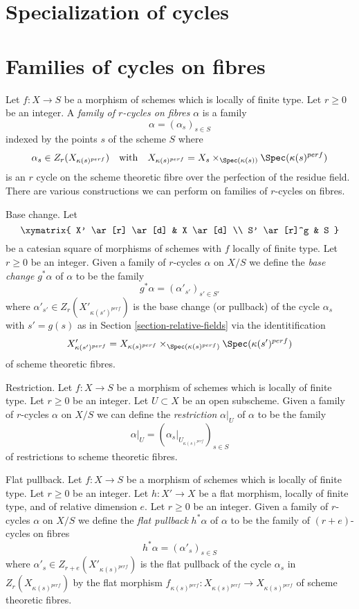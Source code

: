 \section{Specialization of cycles}
\label{section-specialization}


\section{Families of cycles on fibres}
\label{section-cycles-fibres}

\noindent
Let $f : X \to S$ be a morphism of schemes which is locally of finite type.
Let $r \geq 0$ be an integer. A {\it family of $r$-cycles on fibres}
$\alpha$ is a family
$$
\alpha = (\alpha_s)_{s \in S}
$$
indexed by the points $s$ of the scheme $S$ where
$$
\alpha_s \in Z_r(X_{\kappa(s)^{perf}})
\quad\text{with}\quad
X_{\kappa(s)^{perf}} = X_s \times_{\Spec(\kappa(s))} \Spec(\kappa(s)^{perf})
$$
is an $r$ cycle on the scheme theoretic fibre over the perfection of
the residue field. There are various constructions we can perform on
families of $r$-cycles on fibres.

\medskip\noindent
Base change. Let
$$
\xymatrix{
X' \ar[r] \ar[d] & X \ar[d] \\
S' \ar[r]^g & S
}
$$
be a catesian square of morphisms of schemes with $f$ locally of finite type.
Let $r \geq 0$ be an integer. Given a family of $r$-cycles $\alpha$
on $X/S$ we define the {\it base change} $g^*\alpha$ of $\alpha$
to be the family
$$
g^*\alpha = (\alpha'_{s'})_{s' \in S'}
$$
where $\alpha'_{s'} \in Z_r(X'_{\kappa(s')^{perf}})$ is the base change
(or pullback) of the cycle $\alpha_s$ with $s' = g(s)$ as in
Section \ref{section-relative-fields} via the identitification
$$
X'_{\kappa(s')^{perf}} =
X_{\kappa(s)^{perf}} \times_{\Spec(\kappa(s)^{perf})} \Spec(\kappa(s')^{perf})
$$
of scheme theoretic fibres.

\medskip\noindent
Restriction. Let $f : X \to S$ be a morphism of schemes which is locally
of finite type. Let $r \geq 0$ be an integer. Let $U \subset X$ be an open
subscheme. Given a family of $r$-cycles $\alpha$ on $X/S$ we can define
the {\it restriction} $\alpha|_U$ of $\alpha$ to be the family
$$
\alpha|_U = (\alpha_s|_{U_{\kappa(s)^{perf}}})_{s \in S}
$$
of restrictions to scheme theoretic fibres.

\medskip\noindent
Flat pullback. Let $f : X \to S$ be a morphism of schemes which is locally
of finite type. Let $r \geq 0$ be an integer. Let $h : X' \to X$ be a
flat morphism, locally of finite type, and of relative dimension $e$.
Let $r \geq 0$ be an integer. Given a family of $r$-cycles $\alpha$
on $X/S$ we define the {\it flat pullback} $h^*\alpha$ of $\alpha$
to be the family of $(r + e)$-cycles on fibres
$$
h^*\alpha = (\alpha'_s)_{s \in S}
$$
where $\alpha'_s \in Z_{r + e}(X'_{\kappa(s)^{perf}})$ is the flat pullback
of the cycle $\alpha_s$ in $Z_r(X_{\kappa(s)^{perf}})$ by the flat morphism
$f_{\kappa(s)^{perf}} : X_{\kappa(s)^{perf}} \to X_{\kappa(s)^{perf}}$
of scheme theoretic fibres.

